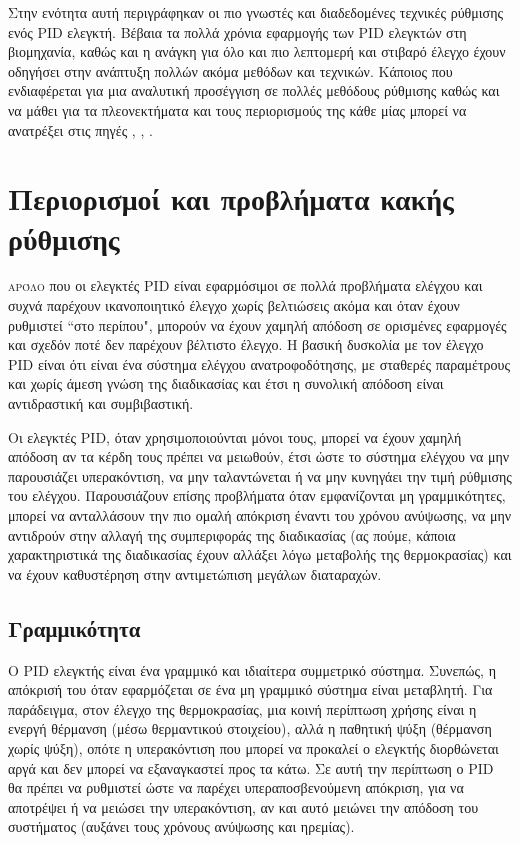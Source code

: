 Στην ενότητα αυτή περιγράφηκαν οι πιο γνωστές και διαδεδομένες τεχνικές ρύθμισης ενός PID ελεγκτή. Βέβαια τα πολλά χρόνια εφαρμογής των PID ελεγκτών στη βιομηχανία, καθώς και η ανάγκη για όλο και πιο λεπτομερή και στιβαρό έλεγχο έχουν οδηγήσει στην ανάπτυξη πολλών ακόμα μεθόδων και τεχνικών.
Κάποιος που ενδιαφέρεται για μια αναλυτική προσέγγιση σε πολλές μεθόδους ρύθμισης καθώς και να μάθει για τα πλεονεκτήματα και τους περιορισμούς της κάθε μίας μπορεί να ανατρέξει στις πηγές \cite{astrom}, \cite{yun}, \cite{kristian}.

\section{Περιορισμοί και προβλήματα κακής ρύθμισης}

\lettrine[findent=2pt]{}{αρόλο} που οι ελεγκτές PID είναι εφαρμόσιμοι σε πολλά προβλήματα ελέγχου και συχνά παρέχουν ικανοποιητικό έλεγχο χωρίς βελτιώσεις ακόμα και όταν έχουν ρυθμιστεί ``στο περίπου", μπορούν να έχουν χαμηλή απόδοση σε ορισμένες εφαρμογές και σχεδόν ποτέ δεν παρέχουν βέλτιστο έλεγχο. Η βασική δυσκολία με τον έλεγχο PID είναι ότι είναι ένα σύστημα ελέγχου ανατροφοδότησης, με σταθερές παραμέτρους και χωρίς άμεση γνώση της διαδικασίας και έτσι η συνολική απόδοση είναι αντιδραστική και συμβιβαστική.

Οι ελεγκτές PID, όταν χρησιμοποιούνται μόνοι τους, μπορεί να έχουν χαμηλή απόδοση αν τα κέρδη τους πρέπει να μειωθούν, έτσι ώστε το σύστημα ελέγχου να μην παρουσιάζει υπερακόντιση, να μην ταλαντώνεται ή να μην κυνηγάει την τιμή ρύθμισης του ελέγχου. Παρουσιάζουν επίσης προβλήματα όταν εμφανίζονται μη γραμμικότητες, μπορεί να ανταλλάσουν την πιο ομαλή απόκριση έναντι του χρόνου ανύψωσης, να μην αντιδρούν στην αλλαγή της συμπεριφοράς της διαδικασίας (ας πούμε, κάποια χαρακτηριστικά της διαδικασίας έχουν αλλάξει λόγω μεταβολής της θερμοκρασίας) και να έχουν καθυστέρηση στην αντιμετώπιση μεγάλων διαταραχών.

\subsection{Γραμμικότητα}

Ο PID ελεγκτής είναι ένα γραμμικό και ιδιαίτερα συμμετρικό σύστημα. Συνεπώς, η απόκρισή του όταν εφαρμόζεται σε ένα μη γραμμικό σύστημα είναι μεταβλητή. Για παράδειγμα, στον έλεγχο της θερμοκρασίας, μια κοινή περίπτωση χρήσης είναι η ενεργή θέρμανση (μέσω θερμαντικού στοιχείου), αλλά η παθητική ψύξη (θέρμανση χωρίς ψύξη), οπότε η υπερακόντιση που μπορεί να προκαλεί ο ελεγκτής διορθώνεται αργά και δεν μπορεί να εξαναγκαστεί προς τα κάτω. Σε αυτή την περίπτωση ο PID θα πρέπει να ρυθμιστεί ώστε να παρέχει υπεραποσβενούμενη απόκριση, για να αποτρέψει ή να μειώσει την υπερακόντιση, αν και αυτό μειώνει την απόδοση του συστήματος (αυξάνει τους χρόνους ανύψωσης και ηρεμίας).

